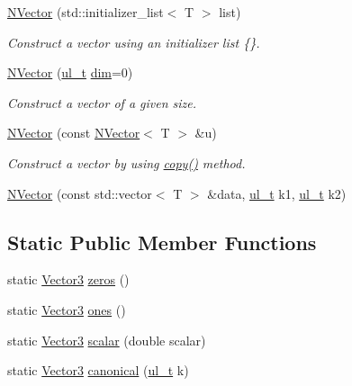 \begin{DoxyCompactItemize}
\mbox{\hyperlink{class_vector3_a44c7b132c668c2aac890b66fe7ab0262}{N\+Vector}} (std\+::initializer\+\_\+list$<$ T $>$ list)
\begin{DoxyCompactList}\small\item\em Construct a vector using an initializer list {\ttfamily \{\}}. \end{DoxyCompactList}\item 
\mbox{\hyperlink{class_vector3_a58eee5f012e4e563d477788051fc7f1d}{N\+Vector}} (\mbox{\hyperlink{typedef_8h_a1b140a2034db3f5dfe18a987745df43a}{ul\+\_\+t}} \mbox{\hyperlink{class_n_vector_a7589027db20509ac4d93490bb9a1979a}{dim}}=0)
\begin{DoxyCompactList}\small\item\em Construct a vector of a given size. \end{DoxyCompactList}\item 
\mbox{\hyperlink{class_vector3_a7f648402b0fc9006ce9ced7ca647e600}{N\+Vector}} (const \mbox{\hyperlink{class_n_vector}{N\+Vector}}$<$ T $>$ \&u)
\begin{DoxyCompactList}\small\item\em Construct a vector by using {\ttfamily \mbox{\hyperlink{class_n_vector_a67128d2ff536b8ccd7a95cb680bd0431}{copy()}}} method. \end{DoxyCompactList}\item 
\mbox{\hyperlink{class_vector3_a402111a5a467efd5741e6a17fbd5c903}{N\+Vector}} (const std\+::vector$<$ T $>$ \&data, \mbox{\hyperlink{typedef_8h_a1b140a2034db3f5dfe18a987745df43a}{ul\+\_\+t}} k1, \mbox{\hyperlink{typedef_8h_a1b140a2034db3f5dfe18a987745df43a}{ul\+\_\+t}} k2)
\end{DoxyCompactItemize}
\subsection*{Static Public Member Functions}
\begin{DoxyCompactItemize}
\item 
static \mbox{\hyperlink{class_vector3}{Vector3}} \mbox{\hyperlink{class_vector3_adcaf5345746bf7d0f5da092faf8bf27b}{zeros}} ()
\item 
static \mbox{\hyperlink{class_vector3}{Vector3}} \mbox{\hyperlink{class_vector3_a7f32f3b57eb6adbec59af6025e6b7778}{ones}} ()
\item 
static \mbox{\hyperlink{class_vector3}{Vector3}} \mbox{\hyperlink{class_vector3_af757c4bd03bd4ddfa74c99fd5a3eee94}{scalar}} (double scalar)
\item 
static \mbox{\hyperlink{class_vector3}{Vector3}} \mbox{\hyperlink{class_vector3_ab8c97969179c890acca9f18d457e06e6}{canonical}} (\mbox{\hyperlink{typedef_8h_a1b140a2034db3f5dfe18a987745df43a}{ul\+\_\+t}} k)
\end{DoxyCompactItemize}
